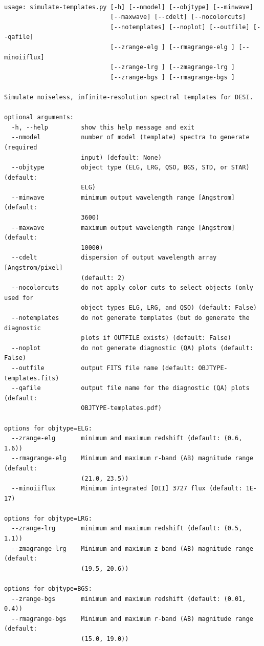 \documentclass[11pt]{article}
\begin{document}
\begin{verbatim}

usage: simulate-templates.py [-h] [--nmodel] [--objtype] [--minwave]
                             [--maxwave] [--cdelt] [--nocolorcuts]
                             [--notemplates] [--noplot] [--outfile] [--qafile]
                             [--zrange-elg ] [--rmagrange-elg ] [--minoiiflux]
                             [--zrange-lrg ] [--zmagrange-lrg ]
                             [--zrange-bgs ] [--rmagrange-bgs ]

Simulate noiseless, infinite-resolution spectral templates for DESI.

optional arguments:
  -h, --help         show this help message and exit
  --nmodel           number of model (template) spectra to generate (required
                     input) (default: None)
  --objtype          object type (ELG, LRG, QSO, BGS, STD, or STAR) (default:
                     ELG)
  --minwave          minimum output wavelength range [Angstrom] (default:
                     3600)
  --maxwave          maximum output wavelength range [Angstrom] (default:
                     10000)
  --cdelt            dispersion of output wavelength array [Angstrom/pixel]
                     (default: 2)
  --nocolorcuts      do not apply color cuts to select objects (only used for
                     object types ELG, LRG, and QSO) (default: False)
  --notemplates      do not generate templates (but do generate the diagnostic
                     plots if OUTFILE exists) (default: False)
  --noplot           do not generate diagnostic (QA) plots (default: False)
  --outfile          output FITS file name (default: OBJTYPE-templates.fits)
  --qafile           output file name for the diagnostic (QA) plots (default:
                     OBJTYPE-templates.pdf)

options for objtype=ELG:
  --zrange-elg       minimum and maximum redshift (default: (0.6, 1.6))
  --rmagrange-elg    Minimum and maximum r-band (AB) magnitude range (default:
                     (21.0, 23.5))
  --minoiiflux       Minimum integrated [OII] 3727 flux (default: 1E-17)

options for objtype=LRG:
  --zrange-lrg       minimum and maximum redshift (default: (0.5, 1.1))
  --zmagrange-lrg    Minimum and maximum z-band (AB) magnitude range (default:
                     (19.5, 20.6))

options for objtype=BGS:
  --zrange-bgs       minimum and maximum redshift (default: (0.01, 0.4))
  --rmagrange-bgs    Minimum and maximum r-band (AB) magnitude range (default:
                     (15.0, 19.0))

\end{verbatim}
\end{document}
